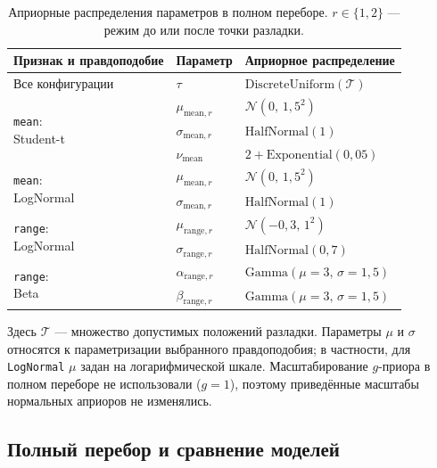 \documentclass[14pt]{mmcs_article}
\begin{document}
\begin{table}[H]
\centering
\caption{Априорные распределения параметров в полном переборе.
$r\in\{1,2\}$ --- режим до или после точки разладки.}
\label{tab:priors}
\begin{tabular}{lll}
\toprule
Признак и правдоподобие & Параметр & Априорное распределение\\
\midrule
Все конфигурации & $\tau$ &
$\mathrm{DiscreteUniform}(\mathcal T)$\\
\midrule
\multirow{3}{*}{\parbox{36mm}{\texttt{mean}:\\
Student-t}} &
$\mu_{\mathrm{mean},r}$ & $\mathcal N(0,\,1{,}5^2)$\\
& $\sigma_{\mathrm{mean},r}$ & $\mathrm{HalfNormal}(1)$\\
& $\nu_{\mathrm{mean}}$ & $2+\mathrm{Exponential}(0{,}05)$\\
\midrule
\multirow{2}{*}{\parbox{36mm}{\texttt{mean}:\\
LogNormal}} &
$\mu_{\mathrm{mean},r}$ & $\mathcal N(0,\,1{,}5^2)$\\
& $\sigma_{\mathrm{mean},r}$ & $\mathrm{HalfNormal}(1)$\\
\midrule
\multirow{2}{*}{\parbox{36mm}{\texttt{range}:\\
LogNormal}} &
$\mu_{\mathrm{range},r}$ & $\mathcal N(-0{,}3,\,1^2)$\\
& $\sigma_{\mathrm{range},r}$ & $\mathrm{HalfNormal}(0{,}7)$\\
\midrule
\multirow{2}{*}{\parbox{36mm}{\texttt{range}:\\
Beta}} &
$\alpha_{\mathrm{range},r}$ & $\mathrm{Gamma}(\mu=3,\,\sigma=1{,}5)$\\
& $\beta_{\mathrm{range},r}$ & $\mathrm{Gamma}(\mu=3,\,\sigma=1{,}5)$\\
\bottomrule
\end{tabular}
\end{table}

Здесь $\mathcal T$ --- множество допустимых положений разладки.
Параметры $\mu$ и $\sigma$ относятся к параметризации выбранного
правдоподобия; в частности, для \texttt{LogNormal} $\mu$ задан на
логарифмической шкале. Масштабирование $g$-приора в полном переборе не
использовали ($g=1$), поэтому приведённые масштабы нормальных априоров
не изменялись.

\subsection{Полный перебор и сравнение моделей}
\end{document}
